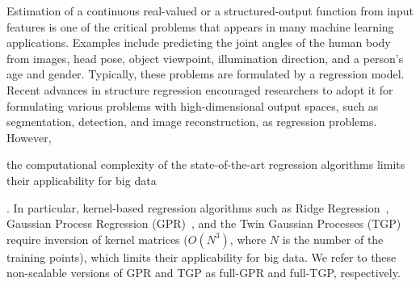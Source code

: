 
 Estimation of a continuous real-valued or a structured-output function from input features is one of the critical problems that appears  in many machine learning  applications. Examples include predicting the joint angles of the human body from images, head pose, object viewpoint, illumination direction, and a person's age and gender. Typically, these problems are formulated by a regression model.  Recent advances in structure regression encouraged researchers to adopt it for formulating various problems with high-dimensional output spaces, such as segmentation, detection, and image reconstruction, as regression problems. However, the computational complexity of the state-of-the-art regression algorithms limits their applicability for big data. In particular,  kernel-based regression algorithms such as Ridge Regression~\cite{ridgeReg70}, Gaussian Process Regression (GPR)~\cite{Rasmussen:2005}, and the Twin Gaussian Processes (TGP)~\cite{Bo:2010} require inversion of kernel matrices ($O(N^3)$, where $N$ is the number of the training points), which limits their applicability for big data. We refer to these non-scalable versions of GPR and TGP as full-GPR and full-TGP, respectively.
 




